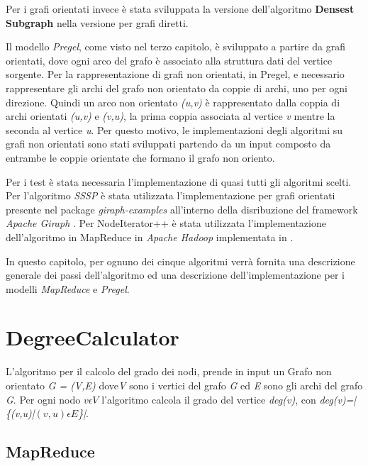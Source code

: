 \documentclass[LaM,binding=0.6cm]{sapthesis}
\begin{document}
Per i grafi orientati invece è stata sviluppata la versione dell'algoritmo \textbf{Densest Subgraph} \cite{DBLP:journals/corr/abs-1201-6567} nella versione per grafi diretti.

Il modello \textit{Pregel}, come visto nel terzo capitolo, è sviluppato a partire da grafi orientati, dove ogni arco del grafo è associato alla struttura dati del vertice sorgente. Per la rappresentazione di grafi non orientati, in Pregel, e necessario rappresentare gli archi del grafo non orientato da coppie di archi, uno per ogni direzione. Quindi un arco non orientato \textit{(u,v)} è rappresentato dalla coppia di archi orientati \textit{(u,v) }e \textit{(v,u)}, la prima coppia associata al vertice \textit{v} mentre la seconda al vertice \textit{u}.
Per questo motivo, le implementazioni degli algoritmi su grafi non orientati sono stati sviluppati partendo da un input composto da entrambe le coppie orientate che formano il grafo non oriento.

Per i test è stata necessaria l'implementazione di quasi tutti gli algoritmi scelti. Per l'algoritmo \textit{SSSP} è stata utilizzata l'implementazione per grafi orientati presente nel package \textit{giraph-examples} all'interno della disribuzione del framework \textit{Apache Giraph} \cite{4_giraph.apache.org_2015}.
Per  NodeIterator++ è stata utilizzata l'implementazione dell'algoritmo in MapReduce in \textit{Apache Hadoop} \cite{1_hadoop.apache.org_2015} implementata in \cite{DBLP:journals/corr/FinocchiFF14}.
 
In questo capitolo, per ognuno dei cinque algoritmi verrà fornita una descrizione generale dei passi dell'algoritmo ed una descrizione dell'implementazione per i modelli \textit{MapReduce} e \textit{Pregel}.



\section{DegreeCalculator}

L'algoritmo per il calcolo del grado dei nodi, prende in input un Grafo non orientato \textit{G = (V,E)} dove\textit {V} sono i vertici del grafo \textit{G} ed \textit{E} sono gli archi del grafo \textit{G}. Per ogni nodo \textit{$v \epsilon V$} l'algoritmo calcola il grado del vertice \textit{deg(v)}, con  \textit{deg(v)=|\{(v,u)|$(v,u) \epsilon E$\}|}.

\subsection{MapReduce}
\end{document}
